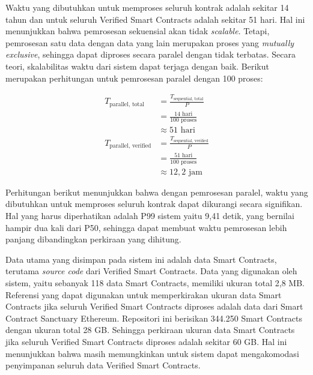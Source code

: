 Waktu yang dibutuhkan untuk memproses seluruh kontrak adalah sekitar 14 tahun dan untuk seluruh Verified Smart Contracts adalah sekitar 51 hari. Hal ini menunjukkan bahwa pemrosesan sekuensial akan tidak \textit{scalable}. Tetapi, pemrosesan satu data dengan data yang lain merupakan proses yang \textit{mutually exclusive}, sehingga dapat diproses secara paralel dengan tidak terbatas. Secara teori, skalabilitas waktu dari sistem dapat terjaga dengan baik. Berikut merupakan perhitungan untuk pemrosesan paralel dengan 100 proses:

\begin{align*}
	T_{\text{parallel, total}}    & = \frac{T_{\text{sequential, total}}}{P}     \\
	                              & = \frac{14 \text{ hari}}{100 \text{ proses}} \\
	                              & \approx 51 \text{ hari}                      \\
	T_{\text{parallel, verified}} & = \frac{T_{\text{sequential, verified}}}{P}  \\
	                              & = \frac{51 \text{ hari}}{100 \text{ proses}} \\
	                              & \approx 12,2 \text{ jam}
\end{align*}

Perhitungan berikut menunjukkan bahwa dengan pemrosesan paralel, waktu yang dibutuhkan untuk memproses seluruh kontrak dapat dikurangi secara signifikan. Hal yang harus diperhatikan adalah P99 sistem yaitu 9,41 detik, yang bernilai hampir dua kali dari P50, sehingga dapat membuat waktu pemrosesan lebih panjang dibandingkan perkiraan yang dihitung.


Data utama yang disimpan pada sistem ini adalah data Smart Contracts, terutama \textit{source code} dari Verified Smart Contracts. Data yang digunakan oleh sistem, yaitu sebanyak 118 data Smart Contracts, memiliki ukuran total 2,8 MB. Referensi yang dapat digunakan untuk memperkirakan ukuran data Smart Contracts jika seluruh Verified Smart Contracts diproses adalah data dari Smart Contract Sanctuary Ethereum. Repositori ini berisikan 344.250 Smart Contracts dengan ukuran total 28 GB. Sehingga perkiraan ukuran data Smart Contracts jika seluruh Verified Smart Contracts diproses adalah sekitar 60 GB. Hal ini menunjukkan bahwa masih memungkinkan untuk sistem dapat mengakomodasi penyimpanan seluruh data Verified Smart Contracts.

